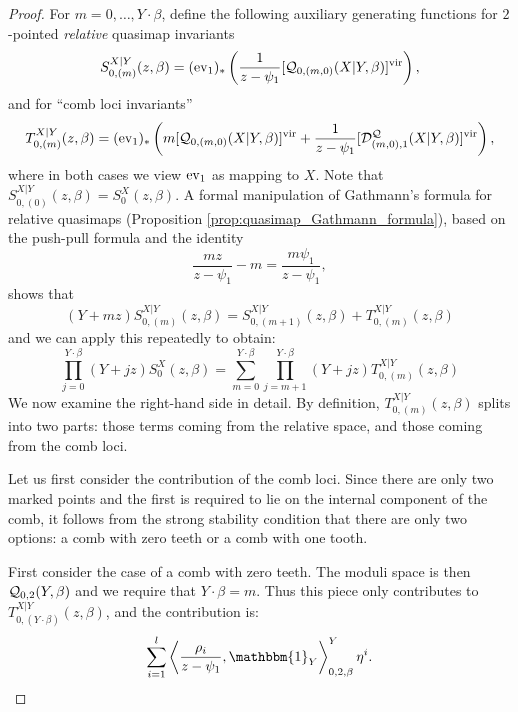 \begin{proof}
For $m = 0, \ldots, Y \cdot \beta$, define the following auxiliary generating functions for $2$-pointed \emph{relative} quasimap invariants
 \[
  S_{0,(m)}^{X|Y}(z,\beta)=(\operatorname{ev}_1)_*\left(\frac{1}{z-\psi_1}[\mathcal{Q}_{0,(m,0)}(X|Y,\beta)]^{\mathrm{vir}}\right),
 \]
and for ``comb loci invariants''
\[
 T_{0,(m)}^{X|Y}(z,\beta)=(\operatorname{ev}_1)_*\left(m [\mathcal{Q}_{0,(m,0)}(X|Y,\beta)]^{\mathrm{vir}}+\frac{1}{z-\psi_1} [\mathcal{D}^{\mathcal{Q}}_{(m,0),1}(X|Y,\beta)]^{\mathrm{vir}} \right),
\]
where in both cases we view $\operatorname{ev}_1$ as mapping to $X$. Note that  $S_{0,(0)}^{X|Y}(z,\beta) = S_0^X(z, \beta)$. A formal manipulation of Gathmann's formula for relative quasimaps (Proposition \ref{prop:quasimap_Gathmann_formula}), based on the push-pull formula and the identity
\[\frac{mz}{z-\psi_1}-m=\frac{m\psi_1}{z-\psi_1},\]
shows that
\begin{equation}
 (Y+mz) S_{0,(m)}^{X|Y}(z,\beta) = S_{0,(m+1)}^{X|Y}(z,\beta)+ T_{0,(m)}^{X|Y}(z,\beta)
\end{equation}
and we can apply this repeatedly to obtain:
\begin{equation} \label{eqn:G}
\prod_{j=0}^{Y\cdot\beta}(Y+jz) S_0^X(z,\beta) = \sum_{m=0}^{Y\cdot\beta}\prod_{j=m+1}^{Y\cdot\beta}(Y+jz)T_{0,(m)}^{X|Y}(z,\beta)
\end{equation}
We now examine the right-hand side in detail. By definition, $T_{0,(m)}^{X|Y}(z,\beta)$ splits into two parts: those terms coming from the relative space, and those coming from the comb loci.

Let us first consider the contribution of the comb loci. Since there are only two marked points and the first is required to lie on the internal component of the comb, it follows from the strong stability condition that there are only two options: a comb with zero teeth or a comb with one tooth.

First consider the case of a comb with zero teeth. The moduli space is then $\mathcal{Q}_{0,2}(Y,\beta)$ and we require that $Y \cdot \beta = m$. Thus this piece only contributes to $T_{0,(Y\cdot\beta)}^{X|Y}(z,\beta)$, and the contribution is:
\begin{equation*} \sum_{i=1}^l \left\langle \dfrac{\rho_i}{z-\psi_1}, \mathbbm{1}_Y \right\rangle_{0,2,\beta}^Y \eta^i. \end{equation*}


\end{proof}
